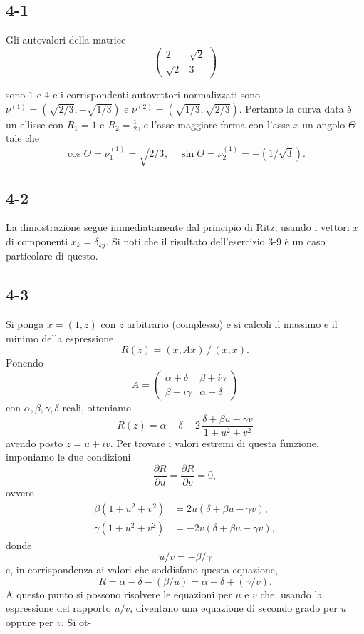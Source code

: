 \documentclass[11pt, a4paper]{book}
\numberwithin{equation}{section}
\begin{document}
\subsection*{4-1}
Gli autovalori della matrice
\[
\begin{pmatrix} 2 & \sqrt{2} \\ \sqrt{2} & 3 \end{pmatrix}
\] %

sono $1$ e $4$ e i corrispondenti autovettori normalizzati sono
$\nu^{(1)} = (\sqrt{2/3}, -\sqrt{1/3})$ e
$\nu^{(2)} = (\sqrt{1/3}, \sqrt{2/3})$.
Pertanto la curva data è un ellisse con $R_1 = 1$ e $R_2 = \frac{1}{2}$,
e l'asse maggiore forma con l'asse $x$ un angolo $\Theta$ tale che
\[
\cos\Theta = \nu_1^{(1)} = \sqrt{2/3}, \quad
\sin\Theta = \nu_2^{(1)} = -(1/\sqrt{3}).
\]

\subsection*{4-2}
La dimostrazione segue immediatamente dal principio di Ritz, usando i
vettori $x$ di componenti $x_k = \delta_{kj}$. Si noti che il risultato
dell'esercizio 3-9 è un caso particolare di questo.

\subsection*{4-3}
Si ponga $x = (1, z)$ con $z$ arbitrario (complesso) e si calcoli il
massimo e il minimo della espressione
\[
R(z) = (x, Ax)\,/\,(x,x).
\]
Ponendo
\[
A = \begin{pmatrix} \alpha+\delta & \beta+i\gamma \\ \beta-i\gamma & \alpha-\delta \end{pmatrix}
\]
con $\alpha,\beta,\gamma,\delta$ reali, otteniamo
\[
R(z) = \alpha - \delta + 2\,\frac{\delta + \beta u - \gamma v}{1+u^2+v^2}
\]
avendo posto $z = u+iv$. Per trovare i valori estremi di questa funzione,
imponiamo le due condizioni
\[
\frac{\partial R}{\partial u} = \frac{\partial R}{\partial v} = 0,
\]
ovvero
\begin{align*}
\beta(1+u^2+v^2) &= 2u(\delta+\beta u - \gamma v), \\
\gamma(1+u^2+v^2) &= -2v(\delta+\beta u - \gamma v),
\end{align*}
donde
\[
u/v = -\beta/\gamma
\]
e, in corrispondenza ai valori che soddisfano questa equazione,
\[
R = \alpha - \delta - (\beta/u) = \alpha - \delta + (\gamma/v).
\]
A questo punto si possono risolvere le equazioni per $u$ e $v$ che,
usando la espressione del rapporto $u/v$, diventano una equazione di
secondo grado per $u$ oppure per $v$. Si ot-
\end{document}
